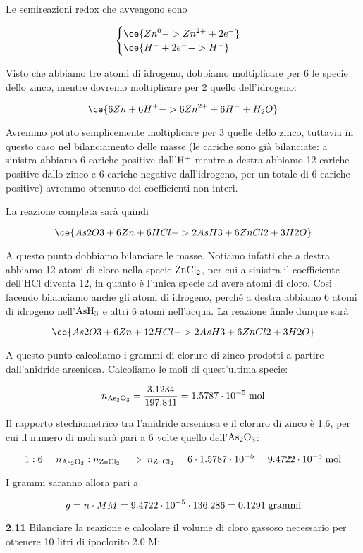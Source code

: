 Le semireazioni redox che avvengono sono

$$\begin{cases}
    \ce{Zn^{0} -> Zn^{2+} + 2e^-}\\
    \ce{H^+ + 2e^- -> H^-}
\end{cases}$$

Visto che abbiamo tre atomi di idrogeno, dobbiamo moltiplicare per 6 le specie dello zinco, mentre dovremo moltiplicare per 2 quello dell'idrogeno:

$$\ce{6Zn + 6H^+ -> 6Zn^{2+} + 6H^- + H_2O}$$

Avremmo potuto semplicemente moltiplicare per 3 quelle dello zinco, tuttavia in questo caso nel bilanciamento delle masse (le cariche sono già bilanciate: a sinistra abbiamo 6 cariche positive dall'$\rm H^+$ mentre a destra abbiamo 12 cariche positive dallo zinco e 6 cariche negative dall'idrogeno, per un totale di 6 cariche positive) avremmo ottenuto dei coefficienti non interi.

La reazione completa sarà quindi 

$$\ce{As2O3 + 6Zn + 6HCl -> 2AsH3 + 6ZnCl2 + 3H2O}$$

A questo punto dobbiamo bilanciare le masse. Notiamo infatti che a destra abbiamo 12 atomi di cloro nella specie $\rm ZnCl_2$, per cui a sinistra il coefficiente dell'HCl diventa 12, in quanto è l'unica specie ad avere atomi di cloro. Così facendo bilanciamo anche gli atomi di idrogeno, perché a destra abbiamo 6 atomi di idrogeno nell'$\rm AsH_3$ e altri 6 atomi nell'acqua. La reazione finale dunque sarà

$$\ce{As2O3 + 6Zn + 12HCl -> 2AsH3 + 6ZnCl2 + 3H2O}$$

A questo punto calcoliamo i grammi di cloruro di zinco prodotti a partire dall'anidride arseniosa. Calcoliamo le moli di quest'ultima specie:

$$n_{\rm As_2O_3}=\frac{3.1234}{197.841}
=1.5787 \cdot 10^{-5} \; \rm mol$$

Il rapporto stechiometrico tra l'anidride arseniosa e il cloruro di zinco è 1:6, per cui il numero di moli sarà pari a 6 volte quello dell'$\rm As_2O_3$:

$$1:6=n_{\rm As_2O_3}:n_{\rm ZnCl_2}
\implies
n_{\rm ZnCl_2}=6 \cdot 1.5787 \cdot 10^{-5}
=9.4722 \cdot 10^{-5} \; \rm mol$$

I grammi saranno allora pari a 

$$g=n \cdot MM
=9.4722 \cdot 10^{-5} \cdot 136.286
=0.1291 \; \rm grammi$$

\vspace{0.2cm}\textbf{2.11} Bilanciare la reazione e calcolare il volume di cloro gassoso necessario per ottenere 10 litri di ipoclorito 2.0 M:

